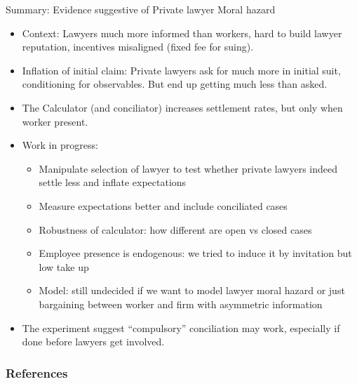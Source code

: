 \documentclass[9pt]{beamer}
\begin{document}
\begin{frame}{Summary: Evidence suggestive of Private lawyer Moral hazard}
  \begin{itemize}
  \item \alert{Context:} Lawyers much more informed than workers, hard to build lawyer reputation, incentives misaligned (fixed fee for suing).
    \vspace{0.05in}
  \item \alert{Inflation of initial claim:} Private lawyers ask for much more in initial suit, conditioning for observables. But end up getting much less than asked. 
    \vspace{0.05in}
  \item  The Calculator (and conciliator) increases settlement rates, but \alert{only when worker present}.
    \vspace{0.05in}
  \item Work in progress:
  \vspace{0.05in}
    \begin{itemize}
    \item \alert{Manipulate selection of lawyer} to test whether private lawyers indeed settle less and inflate expectations
      \vspace{0.05in}
    \item Measure expectations better and include conciliated cases
      \vspace{0.05in}
    \item Robustness of calculator: how different are open vs closed cases
      \vspace{0.05in}
    \item Employee presence is endogenous: we tried to induce it by invitation but low take up
      \vspace{0.05in}
    \item Model: still undecided if we want to model lawyer moral hazard or just bargaining between worker and firm with asymmetric information
      \vspace{0.05in} 

    \end{itemize}
    
  \item  \alert{The experiment suggest ``compulsory'' conciliation may work, especially if done before lawyers get involved.}
  \end{itemize}

\end{frame}

\begin{frame}[allowframebreaks]
        \frametitle{References}




\end{frame}
\end{document}
